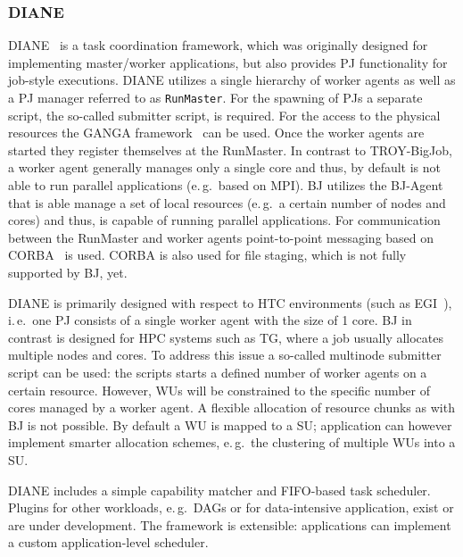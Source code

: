 \documentclass{sig-alternate}
\begin{document}
\subsubsection{DIANE}
DIANE~\cite{Moscicki:908910} is a task coordination framework, which
was originally designed for implementing master/worker applications,
but also provides PJ functionality for job-style executions. DIANE
utilizes a single hierarchy of worker agents as well as a PJ manager
referred to as \texttt{RunMaster}.
For the spawning of PJs a separate script, the so-called submitter script, is
required. For the access to the physical resources the GANGA
framework~\cite{Moscicki20092303} can be used.
Once the worker agents are started they register themselves at the RunMaster.
In contrast to TROY-BigJob, a worker agent generally manages only a single
core and thus, by default is not able to run parallel applications (e.\,g.\
based on MPI). BJ utilizes the BJ-Agent that is able manage a set of local
resources (e.\,g.\ a certain number of nodes and cores) and thus, is capable
of running parallel applications. For communication between the RunMaster and
worker agents point-to-point messaging based on CORBA~\cite{OMG-CORBA303:2004}
is used. CORBA is also used for file staging, which is not fully supported by
BJ, yet.

DIANE is primarily designed with respect to HTC environments (such as
EGI~\cite{egi}), i.\,e.\ one PJ consists of a single worker agent with the
size of 1 core. BJ in contrast is designed for HPC systems such as TG,
where a job usually allocates multiple nodes and cores. To address this issue
a so-called multinode submitter script can be used: the scripts starts a
defined number of worker agents on a certain resource. However, WUs will be
constrained to the specific number of cores managed by a worker agent. A
flexible allocation of resource chunks as with BJ is not possible. By
default a WU is mapped to a SU; application can however implement smarter
allocation schemes, e.\,g.\ the clustering of multiple WUs into a SU.

DIANE includes a simple capability matcher and FIFO-based task scheduler.
Plugins for other workloads, e.\,g.\ DAGs or for data-intensive
application, exist or are under development. The framework is extensible:
applications can implement a custom application-level scheduler.
\end{document}
